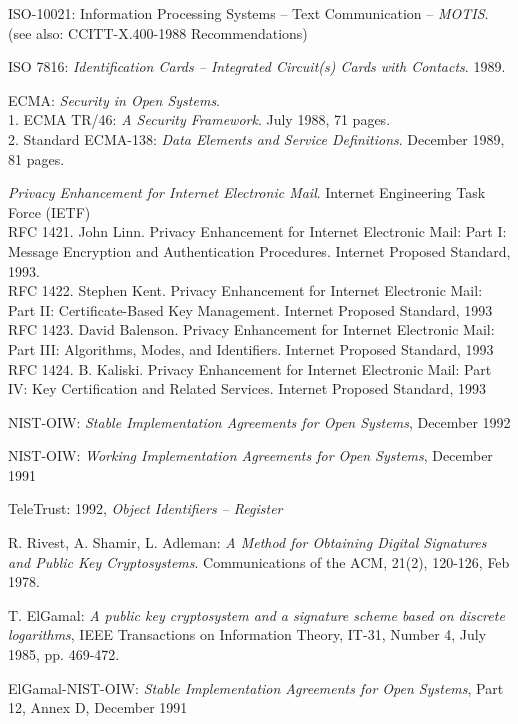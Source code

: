 \begin{thebibliography}{99}
ISO-10021:
Information Processing Systems --
Text Communication --
{\em MOTIS}.
(see also: CCITT-X.400-1988 Recommendations)

ISO 7816:
{\em Identification Cards --
Integrated Circuit(s) Cards with Contacts}.
1989.

ECMA:
{\em Security in Open Systems}.
\\
1. ECMA TR/46:
{\em A Security Framework}.
July 1988, 71 pages.
\\
2. Standard ECMA-138:
{\em Data Elements and Service Definitions}.
December 1989, 81 pages.

{\em Privacy Enhancement for Internet Electronic Mail}.
Internet Engineering Task Force (IETF) \\
RFC 1421. John Linn.  Privacy Enhancement for Internet Electronic Mail:  Part I:
Message Encryption and Authentication Procedures.  Internet Proposed Standard,
1993. \\
RFC 1422. Stephen Kent.  Privacy Enhancement for Internet Electronic Mail:  Part
II: Certificate-Based Key Management.  Internet Proposed Standard, 1993 \\
RFC 1423. David Balenson.  Privacy Enhancement for Internet Electronic Mail:
Part III: Algorithms, Modes, and Identifiers.  Internet Proposed Standard, 1993 \\
RFC 1424. B. Kaliski.  Privacy Enhancement for Internet Electronic Mail:  Part IV:
Key Certification and Related Services.  Internet Proposed Standard, 1993

NIST-OIW: {\em Stable Implementation Agreements for Open Systems}, 
December 1992

NIST-OIW: {\em Working Implementation Agreements for Open Systems}, 
December 1991

TeleTrust: 1992, {\em Object Identifiers -- Register}

R. Rivest, A. Shamir, L. Adleman:
{\em A Method  for Obtaining Digital Signatures
and Public Key Cryptosystems}.
Communications of the ACM, 21(2), 120-126, Feb 1978.

T. ElGamal:  {\em A  public key  cryptosystem  and  a signature
scheme  based  on discrete logarithms}, IEEE  Transactions on
Information    Theory,  IT-31,  Number  4,  July  1985,  pp.
469-472.

ElGamal-NIST-OIW: {\em Stable Implementation Agreements for Open Systems}, 
Part 12, Annex D, December 1991


\end{thebibliography}
